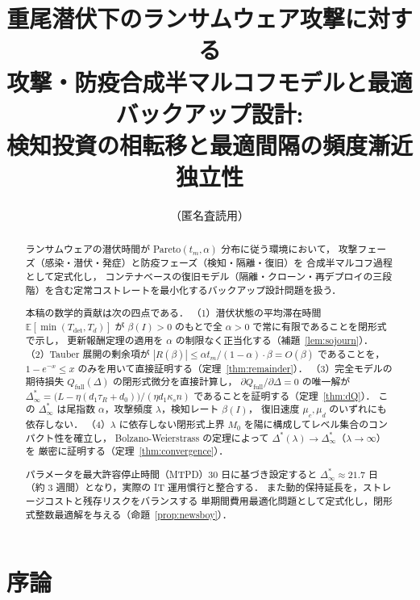 \documentclass[12pt,a4paper]{article}
\theoremstyle{plain}
\theoremstyle{definition}
\theoremstyle{remark}
\newcommand{\E}{\mathbb{E}}
\newcommand{\Qf}{Q_{\mathrm{full}}}
\newcommand{\Tdet}{T_{\mathrm{det}}}
\newcommand{\betaI}{\beta(I)}
\newcommand{\Dopt}{\Delta^{*}}
\newcommand{\Dinf}{\Delta^{*}_{\infty}}
\begin{document}
\title{重尾潜伏下のランサムウェア攻撃に対する\\
攻撃・防疫合成半マルコフモデルと最適バックアップ設計:\\
検知投資の相転移と最適間隔の頻度漸近独立性}
\author{（匿名査読用）}
\date{}
\maketitle

\begin{abstract}
ランサムウェアの潜伏時間が Pareto$(t_m,\alpha)$ 分布に従う環境において，
攻撃フェーズ（感染・潜伏・発症）と防疫フェーズ（検知・隔離・復旧）を
合成半マルコフ過程として定式化し，
コンテナベースの復旧モデル（隔離・クローン・再デプロイの三段階）を含む定常コストレートを最小化するバックアップ設計問題を扱う．

本稿の数学的貢献は次の四点である．
（1）潜伏状態の平均滞在時間 $\E[\min(\Tdet,T_d)]$ が
$\betaI>0$ のもとで全 $\alpha>0$ で常に有限であることを閉形式で示し，
更新報酬定理の適用を $\alpha$ の制限なく正当化する（補題~\ref{lem:sojourn}）．
（2）Tauber 展開の剰余項が $|R(\beta)|\le\alpha t_m/(1-\alpha)\cdot\beta=O(\beta)$
であることを，$1-e^{-x}\le x$ のみを用いて直接証明する（定理~\ref{thm:remainder}）．
（3）完全モデルの期待損失 $\Qf(\Delta)$ の閉形式微分を直接計算し，
$\partial\Qf/\partial\Delta=0$ の唯一解が
$\Dinf=\bigl(L-\eta(d_1\tau_R+d_0)\bigr)/(\eta d_1\kappa_s n)$
であることを証明する（定理~\ref{thm:dQ}）．
この $\Dinf$ は尾指数 $\alpha$，攻撃頻度 $\lambda$，検知レート $\betaI$，
復旧速度 $\mu_c,\mu_d$ のいずれにも依存しない．
（4）$\lambda$ に依存しない閉形式上界 $M_0$ を陽に構成してレベル集合のコンパクト性を確立し，
Bolzano-Weierstrass の定理によって $\Dopt(\lambda)\to\Dinf$（$\lambda\to\infty$）を
厳密に証明する（定理~\ref{thm:convergence}）．

パラメータを最大許容停止時間（MTPD）30 日に基づき設定すると
$\Dinf\approx21.7$ 日（約 3 週間）となり，実際の IT 運用慣行と整合する．
また動的保持延長を，ストレージコストと残存リスクをバランスする
単期間費用最適化問題として定式化し，閉形式整数最適解を与える（命題~\ref{prop:newsboy}）．
\end{abstract}

\tableofcontents
\newpage

\section{序論}
\label{sec:intro}
\end{document}

